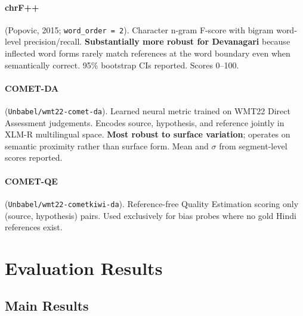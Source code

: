 \documentclass[11pt,a4paper]{article}
\begin{document}
\paragraph{chrF++} (Popovic, 2015; \texttt{word\_order\,=\,2}).
Character n-gram F-score with bigram word-level precision/recall.
\textbf{Substantially more robust for Devanagari} because inflected word forms
rarely match references at the word boundary even when semantically correct.
95\% bootstrap CIs reported. Scores 0--100.

\paragraph{COMET-DA} (\texttt{Unbabel/wmt22-comet-da}).
Learned neural metric trained on WMT22 Direct Assessment judgements.
Encodes source, hypothesis, and reference jointly in XLM-R multilingual space.
\textbf{Most robust to surface variation}; operates on semantic proximity
rather than surface form. Mean and $\sigma$ from segment-level scores reported.

\paragraph{COMET-QE} (\texttt{Unbabel/wmt22-cometkiwi-da}).
Reference-free Quality Estimation scoring only (source, hypothesis) pairs.
Used exclusively for bias probes where no gold Hindi references exist.

\section{Evaluation Results}

\subsection{Main Results}
\end{document}
